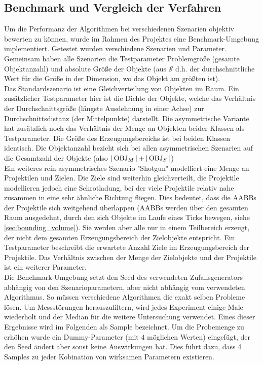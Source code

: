 \subsection{Benchmark und Vergleich der Verfahren}
\label{sec:benchmark}
Um die Performanz der Algorithmen bei verschiedenen Szenarien objektiv bewerten zu können, wurde im Rahmen des Projektes eine Benchmark-Umgebung implementiert. Getestet wurden verschiedene Szenarien und Parameter. Gemeinsam haben alle Szenarien die Testparameter Problemgröße (gesamte Objektanzahl) und absolute Größe der Objekte (aus $\mathcal{S}$ d.h. der durchschnittliche Wert für die Größe in der Dimension, wo das Objekt am größten ist).\\

Das Standardszenario ist eine Gleichverteilung von Objekten im Raum. 
Ein zusätzlicher Testparameter hier ist die Dichte der Objekte, welche das Verhältnis der Durchschnittsgröße (längste Ausdehnung in einer Achse) zur Durchschnittsdistanz (der Mittelpunkte) darstellt. Die asymmetrische Variante hat zusätzlich noch das Verhältnis der Menge an Objekten beider Klassen als Testparameter. Die Größe des Erzeugungsbereichs ist bei beiden Klassen identisch. Die Objektanzahl bezieht sich bei allen asymmetrischen Szenarien auf die Gesamtzahl der Objekte (also $|\operatorname{OBJ}_M| + |\operatorname{OBJ}_S|$)\\
Ein weiteres rein asymmetrisches Szenario "Shotgun" modelliert eine Menge an Projektilen und Zielen. Die Ziele sind weiterhin gleichverteilt, die Projektile modellieren jedoch eine Schrotladung, bei der viele Projektile relativ nahe zusammen in eine sehr ähnliche Richtung fliegen. Dies bedeutet, dass die AABBs der Projektile sich weitgehend überlappen (AABBs werden über den gesamten Raum ausgedehnt, durch den sich Objekte im Laufe eines Ticks bewegen, siehe \ref{sec:bounding_volume}). Sie werden aber alle nur in einem Teilbereich erzeugt, der nicht dem gesamten Erzeugungsbereich der Zielobjekte entspricht. Ein Testparameter beschreibt die erwartete Anzahl Ziele im Erzeugungsbereich der Projektile. Das Verhältnis zwischen der Menge der Zielobjekte und der Projektile ist ein weiterer Parameter.\\
Die Benchmark-Umgebung setzt den Seed des verwendeten Zufallsgenerators abhängig von den Szenarioparametern, aber nicht abhängig vom verwendeten Algorithmus. So müssen verschiedene Algorithmen die exakt selben Probleme lösen. Um Messstörungen herauszufiltern, wird jedes Experiment einige Male wiederholt und der Median für die weitere Untersuchung verwendet. Eines dieser Ergebnisse wird im Folgenden als Sample bezeichnet. Um die Probemenge zu erhöhen wurde ein Dummy-Parameter (mit 4 möglichen Werten) eingefügt, der den Seed ändert aber sonst keine Auswirkungen hat. Dies führt dazu, dass 4 Samples zu jeder Kobination von wirksamen Parametern existieren.\\
